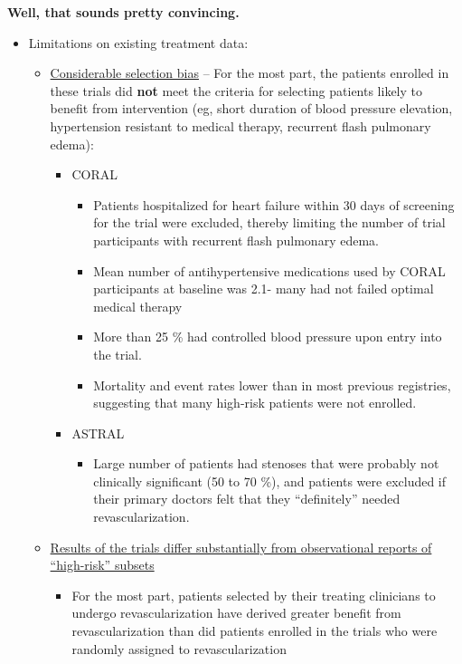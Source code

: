 \documentclass[
]{book}
\providecommand{\tightlist}{%
  \setlength{\itemsep}{0pt}\setlength{\parskip}{0pt}}
\begin{document}
\textbf{Well, that sounds pretty convincing.}

\begin{itemize}
\item
  Limitations on existing treatment data:

  \begin{itemize}
  \item
    \underline{Considerable selection bias} -- For the most part, the
    patients enrolled in these trials did \textbf{not} meet the criteria
    for selecting patients likely to benefit from intervention (eg,
    short duration of blood pressure elevation, hypertension
    resistant to medical therapy, recurrent flash pulmonary edema):

    \begin{itemize}
    \item
      CORAL \citep{cooperStentingMedicalTherapy2014}

      \begin{itemize}
      \item
        Patients hospitalized for heart failure within 30 days
        of screening for the trial were excluded, thereby
        limiting the number of trial participants with recurrent
        flash pulmonary edema.
      \item
        Mean number of antihypertensive medications used by
        CORAL participants at baseline was 2.1- many had not
        failed optimal medical therapy
      \item
        More than 25 \% had controlled blood pressure upon entry
        into the trial.
      \item
        Mortality and event rates lower than in most previous
        registries, suggesting that many high-risk patients were
        not enrolled.
      \end{itemize}
    \item
      ASTRAL
      \citep{astralinvestigatorsRevascularizationMedicalTherapy2009}

      \begin{itemize}
      \tightlist
      \item
        Large number of patients had stenoses that were probably
        not clinically significant (50 to 70 \%), and patients
        were excluded if their primary doctors felt that they
        ``definitely'' needed revascularization.
      \end{itemize}
    \end{itemize}
  \item
    \underline{Results of the trials differ substantially from observational
    reports of ``high-risk'' subsets}

    \begin{itemize}
    \tightlist
    \item
      For the most part, patients selected by their treating
      clinicians to undergo revascularization have derived greater
      benefit from revascularization than did patients enrolled in
      the trials who were randomly assigned to revascularization
    \end{itemize}
  \end{itemize}
\end{itemize}
\end{document}
